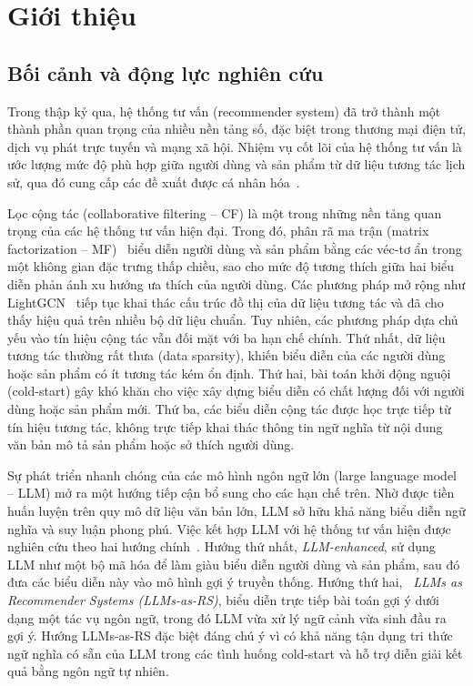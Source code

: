 \chapter{Giới thiệu}
\label{Chapter1}

\section{Bối cảnh và động lực nghiên cứu}
\label{sec:boi-canh}

Trong thập kỷ qua, hệ thống tư vấn (recommender system) đã trở thành một thành phần quan
trọng của nhiều nền tảng số, đặc biệt trong thương mại điện tử, dịch vụ phát trực tuyến và
mạng xã hội. Nhiệm vụ cốt lõi của hệ thống tư vấn là ước lượng mức độ phù hợp giữa người
dùng và sản phẩm từ dữ liệu tương tác lịch sử, qua đó cung cấp các đề xuất được cá nhân
hóa~\cite{zhang2019deep}.

Lọc cộng tác (collaborative filtering -- CF) là một trong những nền tảng quan trọng của các
hệ thống tư vấn hiện đại. Trong đó, phân rã ma trận (matrix factorization -- MF)~\cite{mf2009}
biểu diễn người dùng và sản phẩm bằng các véc-tơ ẩn trong một không gian đặc trưng thấp
chiều, sao cho mức độ tương thích giữa hai biểu diễn phản ánh xu hướng ưa thích của người
dùng. Các phương pháp mở rộng như LightGCN~\cite{lightgcn2020} tiếp tục khai thác cấu
trúc đồ thị của dữ liệu tương tác và đã cho thấy hiệu quả trên nhiều bộ dữ liệu chuẩn. Tuy
nhiên, các phương pháp dựa chủ yếu vào tín hiệu cộng tác vẫn đối mặt với ba hạn chế chính.
Thứ nhất, dữ liệu tương tác thường rất thưa (data sparsity), khiến biểu diễn của các người dùng hoặc sản
phẩm có ít tương tác kém ổn định. Thứ hai, bài toán khởi động nguội (cold-start) gây khó
khăn cho việc xây dựng biểu diễn có chất lượng đối với người dùng hoặc sản phẩm mới. Thứ
ba, các biểu diễn cộng tác được học trực tiếp từ tín hiệu tương tác, không trực tiếp khai thác 
thông tin ngữ nghĩa từ nội dung văn bản mô tả sản phẩm hoặc sở thích người dùng. 

Sự phát triển nhanh chóng của các mô hình ngôn ngữ lớn (large language model -- LLM) mở
ra một hướng tiếp cận bổ sung cho các hạn chế trên. Nhờ được tiền huấn luyện trên quy mô
dữ liệu văn bản lớn, LLM sở hữu khả năng biểu diễn ngữ nghĩa và suy luận phong phú. Việc
kết hợp LLM với hệ thống tư vấn hiện được nghiên cứu theo hai hướng chính~\cite{llmrec2023}.
Hướng thứ nhất, \textit{LLM-enhanced}, sử dụng LLM như một bộ mã hóa để làm giàu biểu diễn người
dùng và sản phẩm, sau đó đưa các biểu diễn này vào mô hình gợi ý truyền thống. Hướng thứ
hai, ~\textit{LLMs as Recommender Systems (LLMs-as-RS)}, biểu diễn trực tiếp bài toán gợi ý dưới dạng một tác vụ ngôn ngữ, trong đó
LLM vừa xử lý ngữ cảnh vừa sinh đầu ra gợi ý. Hướng LLMs-as-RS đặc biệt đáng chú ý vì có
khả năng tận dụng tri thức ngữ nghĩa có sẵn của LLM trong các tình huống cold-start và hỗ
trợ diễn giải kết quả bằng ngôn ngữ tự nhiên.

